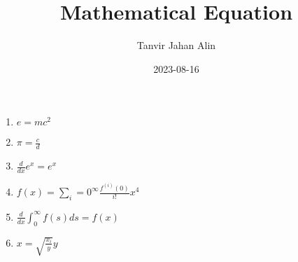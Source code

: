 \documentclass{article}
\title{Mathematical Equation}
\date{2023-08-16}
\author{Tanvir Jahan Alin}
\begin{document}
\maketitle
\begin{enumerate}

\item $e=mc^2 $
\item $\pi=\frac c d $
\item $\frac d{dx}e^x=e^x $
\item $f(x)=\displaystyle \sum_i=0^\infty{\frac{f^{(i)}(0)}{i!}}x^4 $
\item $\frac d {dx} \int_0^\infty f(s)ds=f(x)$
\item $x=\sqrt{\frac {x_i}{y}}y $
\end{enumerate}
\end{document}
